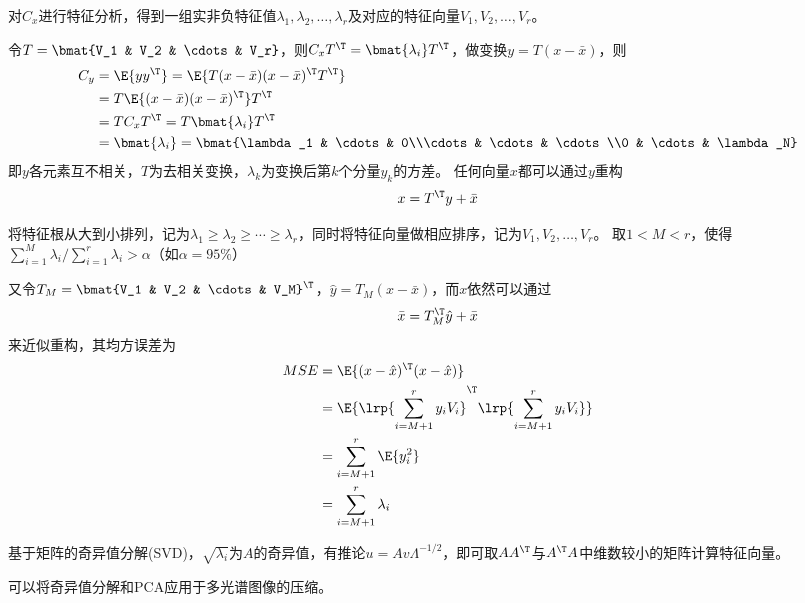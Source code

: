 对$C_x$进行特征分析，得到一组实非负特征值$\lambda_1,\lambda_2,\ldots,\lambda_r$及对应的特征向量$V_1,V_2,\ldots,V_r$。

令$T=\bmat{V_1 & V_2 & \cdots & V_r}$，则$C_xT^\T=\bmat{\lambda_i}T^\T$，做变换$y=T(x-\bar{x})$，则
\[\begin{aligned}
C_y&=\E{yy^\T}=\E{T(x-\bar{x})(x-\bar{x})^\T T^\T}\\
&=T\E{(x-\bar{x})(x-\bar{x})^\T}T^\T\\
&=TC_xT^\T=T\bmat{\lambda_i}T^\T\\
&=\bmat{\lambda_i}=\bmat{\lambda_1 & \cdots & 0\\\cdots & \cdots & \cdots\\0 & \cdots & \lambda_N}
\end{aligned}\]
即$y$各元素互不相关，$T$为去相关变换，$\lambda_k$为变换后第$k$个分量$y_k$的方差。
任何向量$x$都可以通过$y$重构
\[x=T^\T y+\bar{x}\]

将特征根从大到小排列，记为$\lambda_1\geq\lambda_2\geq\cdots\geq\lambda_r$，同时将特征向量做相应排序，记为$V_1,V_2,\ldots,V_r$。
取$1<M<r$，使得$\sum_{i=1}^M\lambda_i\Big/\sum_{i=1}^r\lambda_i>\alpha$（如$\alpha=95\%$）

又令$T_M=\bmat{V_1 & V_2 & \cdots & V_M}^\T$，$\hat{y}=T_M(x-\bar{x})$，而$x$依然可以通过
\[\bar{x}=T^\T_M\hat{y}+\bar{x}\]
来近似重构，其均方误差为
\[\begin{aligned}
MSE &= \E{(x-\hat{x})^\T(x-\hat{x})}\\
&=\E{\lrp{\sum_{i=M+1}^r y_iV_i}^\T\lrp{\sum_{i=M+1}^ry_iV_i}}\\
&=\sum_{i=M+1}^r\E{y_i^2}\\
&=\sum_{i=M+1}^r\lambda_i
\end{aligned}\]

基于矩阵的奇异值分解(SVD)，$\sqrt{\lambda_i}$为$A$的奇异值，有推论$u=Av\Lambda^{-1/2}$，即可取$AA^\T$与$A^\T A$中维数较小的矩阵计算特征向量。

可以将奇异值分解和PCA应用于多光谱图像的压缩。
